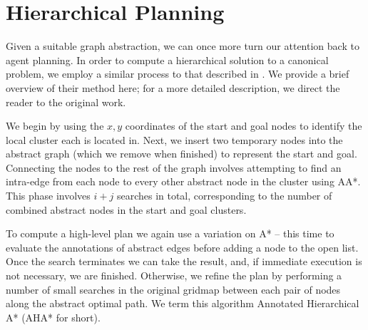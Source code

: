 \section{Hierarchical Planning}
\label{aha:aha}
Given a suitable graph abstraction, we can once more turn our attention back to agent planning. 
In order to compute a hierarchical solution to a canonical problem, we employ a similar process to that described in \cite{botea04}.
We provide a brief overview of their method here; for a more detailed description, we direct the reader to the original work.
\par \indent
We begin by using the $x,y$ coordinates of the start and goal  nodes to identify the local cluster each is located in. 
Next, we insert two temporary nodes into the abstract graph (which we remove when finished) to represent the start and goal.
Connecting the nodes to the rest of the graph involves attempting to find an intra-edge from each node to every other abstract node in the cluster using AA*. 
This phase involves $i+j$ searches in total, corresponding to the number of combined abstract nodes in the start and goal clusters.
\par \indent
To compute a high-level plan we again use a variation on A* -- this time to evaluate the annotations of abstract edges before adding a node to the open list.
Once the search terminates we can take the result, and, if immediate execution is not necessary, we are finished. 
Otherwise, we refine the plan by performing a number of small searches in the original gridmap between each pair of nodes along the abstract optimal path. 
We term this algorithm Annotated Hierarchical A* (AHA* for short).
